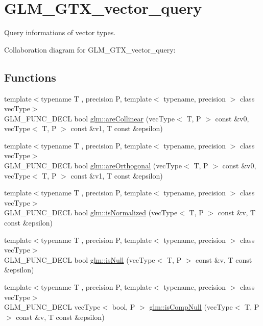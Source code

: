 \hypertarget{group__gtx__vector__query}{\section{G\-L\-M\-\_\-\-G\-T\-X\-\_\-vector\-\_\-query}
\label{group__gtx__vector__query}
}


Query informations of vector types.  


Collaboration diagram for G\-L\-M\-\_\-\-G\-T\-X\-\_\-vector\-\_\-query\-:
\subsection*{Functions}
\begin{DoxyCompactItemize}
\item 
{\footnotesize template$<$typename T , precision P, template$<$ typename, precision $>$ class vec\-Type$>$ }\\G\-L\-M\-\_\-\-F\-U\-N\-C\-\_\-\-D\-E\-C\-L bool \hyperlink{group__gtx__vector__query_ga465b844190d1740051e45d780832ea4c}{glm\-::are\-Collinear} (vec\-Type$<$ T, P $>$ const \&v0, vec\-Type$<$ T, P $>$ const \&v1, T const \&epsilon)
\item 
{\footnotesize template$<$typename T , precision P, template$<$ typename, precision $>$ class vec\-Type$>$ }\\G\-L\-M\-\_\-\-F\-U\-N\-C\-\_\-\-D\-E\-C\-L bool \hyperlink{group__gtx__vector__query_gaee10acefed397c11e01f2862e837754c}{glm\-::are\-Orthogonal} (vec\-Type$<$ T, P $>$ const \&v0, vec\-Type$<$ T, P $>$ const \&v1, T const \&epsilon)
\item 
{\footnotesize template$<$typename T , precision P, template$<$ typename, precision $>$ class vec\-Type$>$ }\\G\-L\-M\-\_\-\-F\-U\-N\-C\-\_\-\-D\-E\-C\-L bool \hyperlink{group__gtx__vector__query_ga6fa5fa2af67d14c205d24c49aad03270}{glm\-::is\-Normalized} (vec\-Type$<$ T, P $>$ const \&v, T const \&epsilon)
\item 
{\footnotesize template$<$typename T , precision P, template$<$ typename, precision $>$ class vec\-Type$>$ }\\G\-L\-M\-\_\-\-F\-U\-N\-C\-\_\-\-D\-E\-C\-L bool \hyperlink{group__gtx__vector__query_ga81a64edc1a2b470b82896592e89c523b}{glm\-::is\-Null} (vec\-Type$<$ T, P $>$ const \&v, T const \&epsilon)
\item 
{\footnotesize template$<$typename T , precision P, template$<$ typename, precision $>$ class vec\-Type$>$ }\\G\-L\-M\-\_\-\-F\-U\-N\-C\-\_\-\-D\-E\-C\-L vec\-Type$<$ bool, P $>$ \hyperlink{group__gtx__vector__query_ga93ecd4137480483ce1af0de8bbbf6546}{glm\-::is\-Comp\-Null} (vec\-Type$<$ T, P $>$ const \&v, T const \&epsilon)

\end{DoxyCompactItemize}

